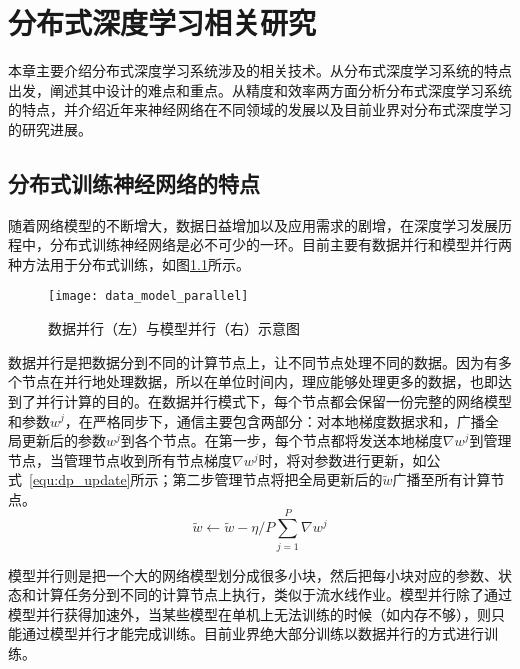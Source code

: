 \chapter{分布式深度学习相关研究}
本章主要介绍分布式深度学习系统涉及的相关技术。从分布式深度学习系统的特点出发，阐述其中设计的难点和重点。从精度和效率两方面分析分布式深度学习系统的特点，并介绍近年来神经网络在不同领域的发展以及目前业界对分布式深度学习的研究进展。
\section{分布式训练神经网络的特点}
随着网络模型的不断增大，数据日益增加以及应用需求的剧增，在深度学习发展历程中，分布式训练神经网络是必不可少的一环。目前主要有数据并行和模型并行两种方法用于分布式训练，如图\ref{fig:data_model_parallel}所示。

\begin{figure}[htp]
\centering
\texttt{[image: data\_model\_parallel]}
\caption{数据并行（左）与模型并行（右）示意图}
\label{fig:data_model_parallel}
\end{figure}
数据并行是把数据分到不同的计算节点上，让不同节点处理不同的数据。因为有多个节点在并行地处理数据，所以在单位时间内，理应能够处理更多的数据，也即达到了并行计算的目的。在数据并行模式下，每个节点都会保留一份完整的网络模型和参数$w^{j}$，在严格同步下，通信主要包含两部分：对本地梯度数据求和，广播全局更新后的参数$w^{j}$到各个节点。在第一步，每个节点都将发送本地梯度$\nabla w^{j}$到管理节点，当管理节点收到所有节点梯度$\nabla w^{j}$时，将对参数进行更新，如公式~\ref{equ:dp_update}所示；第二步管理节点将把全局更新后的$\widetilde w$广播至所有计算节点。
\begin{equation}
\label{equ:dp_update}
\widetilde w \leftarrow \widetilde w - \eta /P \sum^{P}_{j=1}\nabla w^{j}
\end{equation}


模型并行则是把一个大的网络模型划分成很多小块，然后把每小块对应的参数、状态和计算任务分到不同的计算节点上执行，类似于流水线作业。模型并行除了通过模型并行获得加速外，当某些模型在单机上无法训练的时候（如内存不够），则只能通过模型并行才能完成训练。目前业界绝大部分训练以数据并行的方式进行训练。

